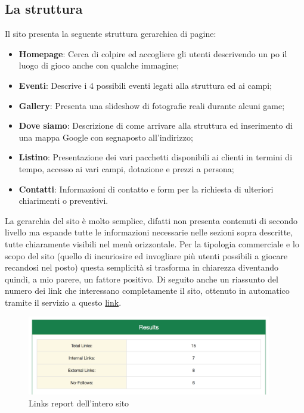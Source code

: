 \documentclass[../Relazione.tex]{subfiles}
\begin{document}
	\subsection{La struttura}
		Il sito presenta la seguente struttura gerarchica di pagine:
		\begin{itemize}
			\item \textbf{Homepage}: Cerca di colpire ed accogliere gli utenti descrivendo un po il luogo di gioco anche con qualche immagine;
			\item \textbf{Eventi}: Descrive i 4 possibili eventi legati alla struttura ed ai campi;
			\item \textbf{Gallery}: Presenta una slideshow di fotografie reali durante alcuni game;
			\item \textbf{Dove siamo}: Descrizione di come arrivare alla struttura ed inserimento di una mappa Google con segnaposto all'indirizzo;
			\item \textbf{Listino}: Presentazione dei vari pacchetti disponibili ai clienti in termini di tempo, accesso ai vari campi, dotazione e prezzi a persona;
			\item \textbf{Contatti}: Informazioni di contatto e form per la richiesta di ulteriori chiarimenti o preventivi.
		\end{itemize}
		
		La gerarchia del sito è molto semplice, difatti non presenta contenuti di secondo livello ma espande tutte le informazioni necessarie nelle sezioni sopra descritte, tutte chiaramente visibili nel menù orizzontale.
		Per la tipologia commerciale e lo scopo del sito (quello di incuriosire ed invogliare più utenti possibili a giocare recandosi nel posto) questa semplicità si trasforma in chiarezza diventando quindi, a mio parere, un fattore positivo.
		Di seguito anche un riassunto del numero dei link che interessano completamente il sito, ottenuto in automatico tramite il servizio a questo \href{http://smallseotools.com/website-links-count-checker/}{link}.

		\begin{figure}[!h]
			\centering
			\includegraphics[width=0.95\textwidth]{img/sito/LinksReport.png}
			\caption{Links report dell'intero sito}
			\label{fig:links}
		\end{figure}
\end{document}
